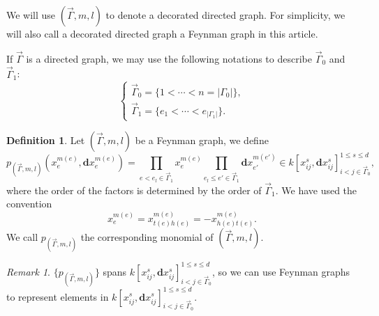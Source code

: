\documentclass[11pt]{amsart}
\theoremstyle{definition}
\newtheorem{defn}[thm]{Definition}
\theoremstyle{remark}
\newtheorem{rem}[thm]{Remark}
\numberwithin{equation}{section}
\begin{document}
We will use $(\vec{\Gamma},m,l)$ to denote a decorated directed graph. For simplicity, we will also call a decorated directed graph a Feynman graph in this article.

If $\vec{\Gamma}$ is a directed graph, we may use the following notations to describe $\vec{\Gamma}_{0}$ and $\vec{\Gamma}_{1}$:
$$
\begin{cases}
    \vec{\Gamma}_{0}=\{1<\cdots<n=|\Gamma_{0}|\},\\
    \vec{\Gamma}_{1}=\{e_{1}<\cdots<e_{|\Gamma_{1}|}\}.
\end{cases}
$$
\begin{defn}
    Let $(\vec{\Gamma},m,l)$ be a Feynman graph, we define
    $$
    p_{(\vec{\Gamma},m,l)}(x_{e}^{m(e)},\mathbf{d}x_{e}^{m(e)})=\prod_{e<e_{l}\in\vec{\Gamma}_{1}}x_{e}^{m(e)}\prod_{e_l\leq e'\in\vec{\Gamma}_{1}}\mathbf{d}x_{e'}^{m(e')}\in k[x_{ij}^{s},\mathbf{d}x_{ij}^{s}]_{i<j\in\vec{\Gamma}_{0}}^{1\leq s\leq d},
    $$
    where the order of the factors is determined by the order of $\vec{\Gamma}_{1}$. We have used the convention
    $$
    x_{e}^{m(e)}=x_{t(e)h(e)}^{m(e)}=-x_{h(e)t(e)}^{m(e)}.
    $$
    We call $p_{(\vec{\Gamma},m,l)}$ the corresponding monomial of $(\vec{\Gamma},m,l)$.
\end{defn}
\begin{rem}
    $\{p_{(\vec{\Gamma},m,l)}\}$ spans $k[x_{ij}^{s},\mathbf{d}x_{ij}^{s}]_{i<j\in\vec{\Gamma}_{0}}^{1\leq s\leq d}$, so we can use Feynman graphs to represent elements in $k[x_{ij}^{s},\mathbf{d}x_{ij}^{s}]_{i<j\in\vec{\Gamma}_{0}}^{1\leq s\leq d}$.
\end{rem}
\end{document}
